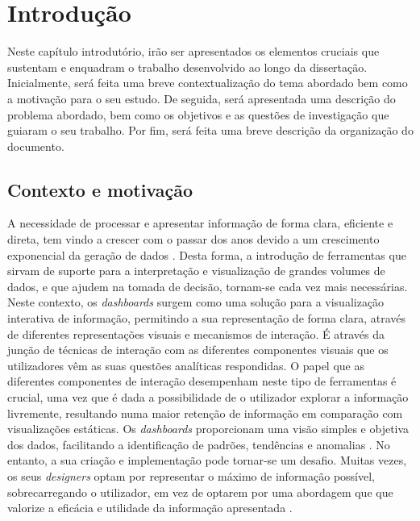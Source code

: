 
%

\chapter{Introdução}
\label{cha:introducao}

Neste capítulo introdutório, irão ser apresentados os elementos cruciais que sustentam e enquadram o trabalho desenvolvido ao longo da dissertação. Inicialmente, será feita uma breve contextualização do tema abordado bem como a motivação para o seu estudo. De seguida, será apresentada uma descrição do problema abordado, bem como os objetivos e as questões de investigação que guiaram o seu trabalho. Por fim, será feita uma breve descrição da organização do documento.

\section{Contexto e motivação}
\label{sec:cont_e_motiv}

A necessidade de processar e apresentar informação de forma clara, eficiente e direta, tem vindo a crescer com o passar dos anos devido a um crescimento exponencial da geração de dados \cite{kitchin2014data}. Desta forma, a introdução de ferramentas que sirvam de suporte para a interpretação e visualização de grandes volumes de dados, e que ajudem na tomada de decisão, tornam-se cada vez mais necessárias. Neste contexto, os \textit{dashboards} surgem como uma solução para a visualização interativa de informação, permitindo a sua representação de forma clara, através de diferentes representações visuais e mecanismos de interação. É através da junção de técnicas de interação com as diferentes componentes visuais que os utilizadores vêm as suas questões analíticas respondidas. O papel que as diferentes componentes de interação desempenham neste tipo de ferramentas é crucial, uma vez que é dada a possibilidade de o utilizador explorar a informação livremente, resultando numa maior retenção de informação em comparação com visualizações estáticas. Os \textit{dashboards} proporcionam uma visão simples e objetiva dos dados, facilitando a identificação de padrões, tendências e anomalias \cite{few2006information}. No entanto, a sua criação e implementação pode tornar-se um desafio. Muitas vezes, os seus \textit{designers} optam por representar o máximo de informação possível, sobrecarregando o utilizador, em vez de optarem por uma abordagem que que valorize a eficácia e utilidade da informação apresentada \cite{eckerson2010performance}.

